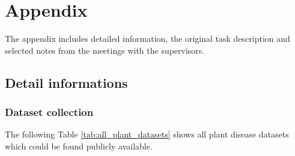 \appendix
\chapter{Appendix}
The appendix includes detailed information, the original task description and selected notes from the meetings with the supervisors.

\section{Detail informations}

\newpage %
\subsection{Dataset collection}
\label{appendix:datasets_tables}
The following Table \ref{tab:all_plant_datasets} shows all plant disease datasets which could be found publicly available. 

